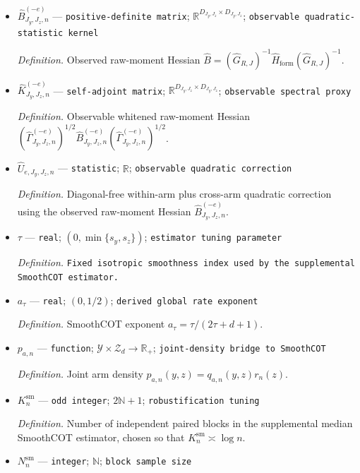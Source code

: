 \documentclass{article}
\begin{document}
\begin{itemize}
  \item \(\widehat B_{J_y,J_z,n}^{(-e)}\) --- \texttt{positive-\allowbreak{}definite matrix}; \(\mathbb R^{D_{J_y,J_z}\times D_{J_y,J_z}}\); \texttt{observable quadratic-\allowbreak{}statistic kernel}
  \par\smallskip\noindent\emph{Definition.} Observed raw-moment Hessian \(\widehat B=(\widehat G_{R,J})^{-1}\widehat H_{\mathrm{form}}(\widehat G_{R,J})^{-1}\).
  \item \(\widehat K_{J_y,J_z,n}^{(-e)}\) --- \texttt{self-\allowbreak{}adjoint matrix}; \(\mathbb R^{D_{J_y,J_z}\times D_{J_y,J_z}}\); \texttt{observable spectral proxy}
  \par\smallskip\noindent\emph{Definition.} Observable whitened raw-moment Hessian \((\widehat\Gamma_{J_y,J_z,n}^{(-e)})^{1/2}\widehat B_{J_y,J_z,n}^{(-e)}(\widehat\Gamma_{J_y,J_z,n}^{(-e)})^{1/2}\).
  \item \(\widehat U_{e,J_y,J_z,n}\) --- \texttt{statistic}; \(\mathbb R\); \texttt{observable quadratic correction}
  \par\smallskip\noindent\emph{Definition.} Diagonal-free within-arm plus cross-arm quadratic correction using the observed raw-moment Hessian \(\widehat B_{J_y,J_z,n}^{(-e)}\).
  \item \(\tau\) --- \texttt{real}; \((0,\min\{s_y,s_z\})\); \texttt{estimator tuning parameter}
  \par\smallskip\noindent\emph{Definition.} \texttt{Fixed isotropic smoothness index used by the supplemental SmoothCOT estimator.}
  \item \(a_\tau\) --- \texttt{real}; \((0,1/2)\); \texttt{derived global rate exponent}
  \par\smallskip\noindent\emph{Definition.} SmoothCOT exponent \(a_\tau=\tau/(2\tau+d+1)\).
  \item \(p_{a,n}\) --- \texttt{function}; \(\mathcal Y\times\mathcal Z_d\to\mathbb R_+\); \texttt{joint-\allowbreak{}density bridge to SmoothCOT}
  \par\smallskip\noindent\emph{Definition.} Joint arm density \(p_{a,n}(y,z)=q_{a,n}(y,z)r_n(z)\).
  \item \(K_n^{\mathrm{sm}}\) --- \texttt{odd integer}; \(2\mathbb N+1\); \texttt{robustification tuning}
  \par\smallskip\noindent\emph{Definition.} Number of independent paired blocks in the supplemental median SmoothCOT estimator, chosen so that \(K_n^{\mathrm{sm}}\asymp\log n\).
  \item \(N_n^{\mathrm{sm}}\) --- \texttt{integer}; \(\mathbb N\); \texttt{block sample size}

\end{itemize}
\end{document}
